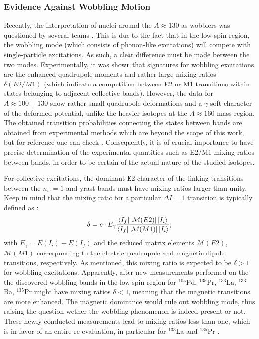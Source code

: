 \subsubsection*{Evidence Against Wobbling Motion}

Recently, the interpretation of nuclei around the $A \approx 130$ as wobblers was questioned by several teams \cite{nomura2021examining,nomura2022questioning,lv2022evidence,guo2020risk}. This is due to the fact that in the low-spin region, the wobbling mode (which consists of phonon-like excitations) will compete with single-particle excitations. As such, a clear difference must be made between the two modes. Experimentally, it was shown that signatures for wobbling excitations are the enhanced quadrupole moments and rather large mixing ratios $\delta(E2/M1)$ (which indicate a competition between E2 or M1 transitions within states belonging to adjacent collective bands). However, the data for $A\approx 100-130$ show rather small quadrupole deformations and a $\gamma$-soft character of the deformed potential, unlike the heavier isotopes at the $A \approx 160$ mass region. The obtained transition probabilities connecting the states between bands are obtained from experimental methods which are beyond the scope of this work, but for reference one can check \cite{lv2022evidence}. Consequently, it is of crucial importance to have precise determination of the experimental quantities such as E2/M1 mixing ratios between bands, in order to be certain of the actual nature of the studied isotopes.

For collective excitations, the dominant E2 character of the linking transitions between the $n_w=1$ and yrast bands must have mixing ratios larger than unity. Keep in mind that the mixing ratio for a particular $\Delta I=1$ transition is typically defined as \cite{krane1970determination,nomura2021examining}:
\begin{align}
    \delta=c\cdot E_\gamma\frac{\bra{I_f}|\mathcal{M}(E2)|\ket{I_i}}{\bra{I_f}|\mathcal{M}(M1)|\ket{I_i}}, 
\end{align}
with $E_\gamma=E(I_i)-E(I_f)$ and the reduced matrix elements $\mathcal{M}(E2)$, $\mathcal{M}(M1)$ corresponding to the electric quadrupole and magnetic dipole transitions, respectively. As mentioned, this mixing ratio is expected to be $\delta >1$ for wobbling excitations. Apparently, after new measurements performed on the the discovered wobbling bands in the low spin region for $^{105}$Pd, $^{135}$Pr, $^{133}$La, $^{133}$Ba, $^{135}$Pr might have mixing ratios $\delta<1$, meaning that the magnetic transitions are more enhanced. The magnetic dominance would rule out wobbling mode, thus raising the question wether the wobbling phenomenon is indeed present or not. These newly conducted measurements lead to mixing ratios less than one, which is in favor of an entire re-evaluation, in particular for $^{133}$La \cite{hua2020comment} and $^{135}$Pr \cite{guo2021comment,lv2022evidence}.

